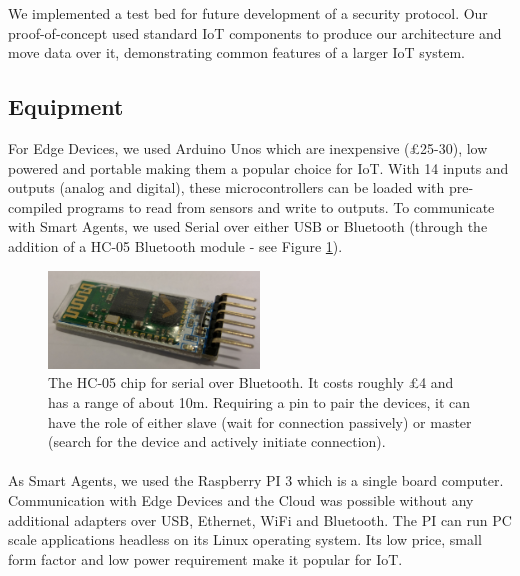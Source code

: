 
We implemented a test bed for future development of a security protocol. Our proof-of-concept used standard IoT components to produce our architecture and move data over it, demonstrating common features of a larger IoT system.



\subsection{Equipment}
For Edge Devices, we used Arduino Unos which are inexpensive (£25-30), low powered and portable making them a popular choice for IoT. With 14 inputs and outputs (analog and digital), these microcontrollers can be loaded with pre-compiled programs to read from sensors and write to outputs. To communicate with Smart Agents, we used Serial over either USB or Bluetooth (through the addition of a HC-05 Bluetooth module - see Figure \ref{fig:HC-05}).


\begin{figure}
    \centering
    \includegraphics[width=0.5\textwidth]{HC05.jpg}
    \caption{The HC-05 chip for serial over Bluetooth. It costs roughly £4 and has a range of about 10m. Requiring a pin to pair the devices, it can have the role of either slave (wait for connection passively) or master (search for the device and actively initiate connection).}
    \label{fig:HC-05}
\end{figure}

\paragraph{}
As Smart Agents, we used the Raspberry PI 3 which is a single board computer. Communication with Edge Devices and the Cloud was possible without any additional adapters over USB, Ethernet, WiFi and Bluetooth. The PI can run PC scale applications headless on its Linux operating system. Its low price, small form factor and low power requirement make it popular for IoT.

